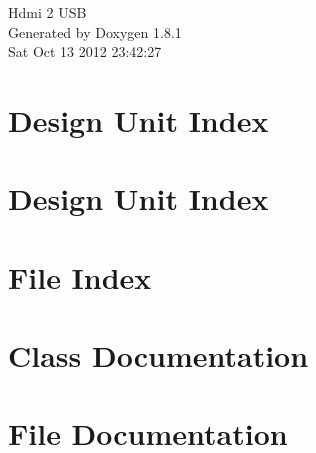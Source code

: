 \documentclass{book}
\begin{document}
\begin{titlepage}
\vspace*{7cm}
\begin{center}
{\Large Hdmi 2 U\-S\-B }\\
\vspace*{1cm}
{\large Generated by Doxygen 1.8.1}\\
\vspace*{0.5cm}
{\small Sat Oct 13 2012 23:42:27}\\
\end{center}
\end{titlepage}
\clearemptydoublepage
{}
\tableofcontents
\clearemptydoublepage
{}
\chapter{Design Unit Index}

\chapter{Design Unit Index}

\chapter{File Index}

\chapter{Class Documentation}





















\chapter{File Documentation}




















\printindex
\end{document}
